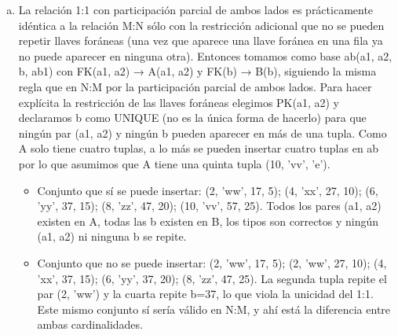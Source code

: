 \begin{enumerate}[a.]
\begin{enumerate}[i.]
  \item Este conjunto no se puede insertar. Con el orden estricto, la primera tupla viola el dominio con a1='zz'. Aunque se reordenaran las columnas como (b, b1, a1, a2, ab1), las FK (a1, a2) sí existirían en A pero se repiten las PK b=27 (tuplas 2 y 4) y b=17 (tuplas 1 y 5), lo cual viola la restricción de llave primaria. Un conjunto que sí se puede insertar es: (17, 'f', 1, 8, 'zz'); (27, 'g', 2, 6, 'yy'); (37, 'h', 3, 4, 'xx'); (47, 'i', 4, 2, 'ww'); (57, 'j', 5, 6, 'yy')

  \item Este conjunto sí se puede insertar. Todas las tuplas respetan los dominios (entero, cadena, entero, entero, cadena), todos los pares (a1, a2) existen en A y todas las b son distintas. Que (4,'xx') aparezca en dos tuplas no viola nada, porque la en una relación 1:N varias tuplas de B pueden referenciar la misma tupla de A.
  \end{enumerate}

\item La relación 1:1 con participación parcial de ambos lados es prácticamente idéntica a la relación M:N sólo con la restricción adicional que no se pueden repetir llaves foráneas (una vez que aparece una llave foránea en una fila ya no puede aparecer en ninguna otra). Entonces tomamos como base ab(a1, a2, b, ab1) con FK(a1, a2) → A(a1, a2) y FK(b) → B(b), siguiendo la misma regla que en N:M por la participación parcial de ambos lados. Para hacer explícita la restricción de las llaves foráneas elegimos PK(a1, a2) y declaramos b como UNIQUE (no es la única forma de hacerlo) para que ningún par (a1, a2) y ningún b pueden aparecer en más de una tupla. Como A solo tiene cuatro tuplas, a lo más se pueden insertar cuatro tuplas en ab por lo que asumimos que A tiene una quinta tupla (10, 'vv', 'e').

  \begin{itemize}
  \item Conjunto que sí se puede insertar: (2, 'ww', 17, 5); (4, 'xx', 27, 10); (6, 'yy', 37, 15); (8, 'zz', 47, 20); (10, 'vv', 57, 25). Todos los pares (a1, a2) existen en A, todas las b existen en B, los tipos son correctos y ningún (a1, a2) ni ninguna b se repite.

  \item Conjunto que no se puede insertar: (2, 'ww', 17, 5); (2, 'ww', 27, 10); (4, 'xx', 37, 15); (6, 'yy', 37, 20); (8, 'zz', 47, 25). La segunda tupla repite el par (2, 'ww') y la cuarta repite b=37, lo que viola la unicidad del 1:1. Este mismo conjunto sí sería válido en N:M, y ahí está la diferencia entre ambas cardinalidades.
  \end{itemize}
\end{enumerate}
